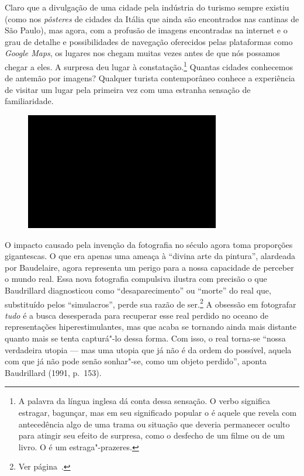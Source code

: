 Claro que a divulgação de uma cidade pela indústria do turismo sempre
existiu (como nos \emph{pôsteres} de cidades da Itália que ainda são
encontrados nas cantinas de São Paulo), mas agora, com a profusão de
imagens encontradas na internet e o grau de detalhe e possibilidades de
navegação oferecidos pelas plataformas como \emph{Google Maps}, os
lugares nos chegam muitas vezes antes de que nós possamos chegar a eles.
A surpresa deu lugar à constatação.\footnote{A palavra da língua inglesa
  {} dá conta dessa sensação. O verbo {}
  significa estragar, bagunçar, mas em seu significado popular o
  {} é aquele que revela com antecedência algo de uma trama
  ou situação que deveria permanecer oculto para atingir seu efeito de
  surpresa, como o desfecho de um filme ou de um livro. O {}
  é um estraga"-prazeres.} Quantas cidades conhecemos de antemão por
imagens? Qualquer turista contemporâneo conhece a experiência de visitar
um lugar pela primeira vez com uma estranha sensação de familiaridade.

\begin{figure}[!ht]

\centering
 \includegraphics[width=85mm]{./imgs/im1.jpg}
\caption{\tiny{}}

\end{figure}

O impacto causado pela invenção da fotografia no século  agora toma
proporções gigantescas. O que era apenas uma ameaça à ``divina arte da
pintura'', alardeada por Baudelaire, agora representa um perigo para a
nossa capacidade de perceber o mundo real. Essa nova fotografia compulsiva ilustra com \label{compulsiva} precisão o que Baudrillard diagnosticou como ``desaparecimento'' ou ``morte'' do real que, substituído pelos ``simulacros'', perde sua razão de ser.\footnote{Ver página~\pageref{deficit}.} A obsessão em fotografar \emph{tudo} é a busca desesperada para recuperar esse real perdido no oceano de representações hiperestimulantes, mas que acaba se tornando ainda mais distante quanto mais se tenta capturá"-lo dessa forma. Com isso, o real torna-se ``nossa verdadeira utopia --- mas uma utopia que já não é da ordem do possível, aquela com que já não pode senão sonhar"-se, como um objeto perdido'', aponta Baudrillard (1991, p.~153).


